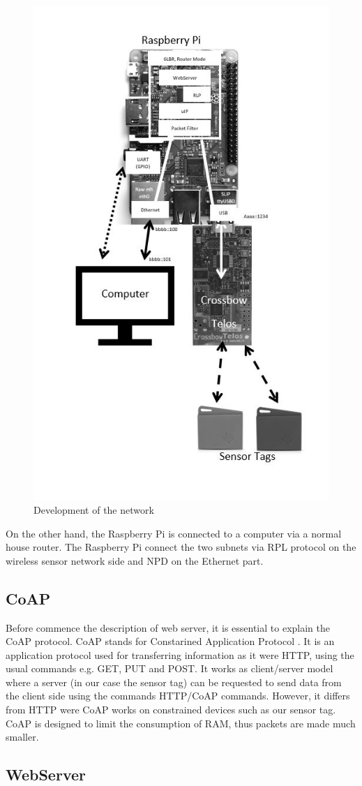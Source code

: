 \begin{figure}[!h]
	\includegraphics[width=\linewidth]{Network}
	\caption{Development of the network}
	\label{fig:Network}
\end{figure}
On the other hand, the Raspberry Pi is connected to a computer via a normal house router.
The Raspberry Pi connect the two subnets via RPL protocol on the wireless sensor network side and NPD on the Ethernet part.\\

\subsection{CoAP}
Before commence the description of web server, it is essential to explain the CoAP protocol. CoAP stands for Constarined Application Protocol \cite{coap}. It is an application protocol used for transferring information as it were HTTP, using the usual commands e.g. GET, PUT and POST. It works as client/server model where a server (in our case the sensor tag) can be requested to send data from the client side using the commands HTTP/CoAP commands. However, it differs from HTTP were CoAP works on constrained devices such as our sensor tag. CoAP is designed to limit the consumption of RAM, thus packets are made much smaller.

\subsection{WebServer}




